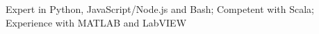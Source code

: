 \item Expert in Python, JavaScript/Node.js and Bash; Competent with Scala; Experience with MATLAB and LabVIEW
